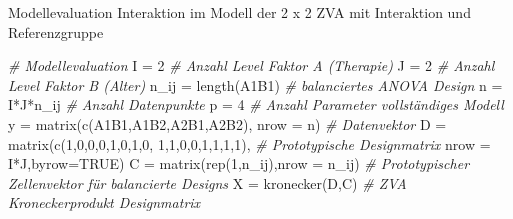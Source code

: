 \documentclass[
  8pt,
  ignorenonframetext,
]{beamer}
\newenvironment{Shaded}{\begin{snugshade}}{\end{snugshade}}
\newcommand{\AttributeTok}[1]{\textcolor[rgb]{0.77,0.63,0.00}{#1}}
\newcommand{\CommentTok}[1]{\textcolor[rgb]{0.56,0.35,0.01}{\textit{#1}}}
\newcommand{\ConstantTok}[1]{\textcolor[rgb]{0.00,0.00,0.00}{#1}}
\newcommand{\DecValTok}[1]{\textcolor[rgb]{0.00,0.00,0.81}{#1}}
\newcommand{\FunctionTok}[1]{\textcolor[rgb]{0.00,0.00,0.00}{#1}}
\newcommand{\NormalTok}[1]{#1}
\newcommand{\OtherTok}[1]{\textcolor[rgb]{0.56,0.35,0.01}{#1}}
\newcommand{\SpecialCharTok}[1]{\textcolor[rgb]{0.00,0.00,0.00}{#1}}
\begin{document}
\begin{frame}[fragile]{\small Modellevaluation \textbar{} Interaktion im
Modell der 2 x 2 ZVA mit Interaktion und Referenzgruppe}
\protect\hypertarget{modellevaluation-interaktion-im-modell-der-2-x-2-zva-mit-interaktion-und-referenzgruppe-1}{}
\vspace{3mm}
\tiny

\begin{Shaded}
\begin{Highlighting}[]
\CommentTok{\# Modellevaluation}
\NormalTok{I          }\OtherTok{=} \DecValTok{2}                                           \CommentTok{\# Anzahl Level Faktor A (Therapie)}
\NormalTok{J          }\OtherTok{=} \DecValTok{2}                                           \CommentTok{\# Anzahl Level Faktor B (Alter)}
\NormalTok{n\_ij       }\OtherTok{=} \FunctionTok{length}\NormalTok{(A1B1)                                }\CommentTok{\# balanciertes ANOVA Design}
\NormalTok{n          }\OtherTok{=}\NormalTok{ I}\SpecialCharTok{*}\NormalTok{J}\SpecialCharTok{*}\NormalTok{n\_ij                                    }\CommentTok{\# Anzahl Datenpunkte}
\NormalTok{p          }\OtherTok{=} \DecValTok{4}                                           \CommentTok{\# Anzahl Parameter vollständiges Modell}
\NormalTok{y          }\OtherTok{=} \FunctionTok{matrix}\NormalTok{(}\FunctionTok{c}\NormalTok{(A1B1,A1B2,A2B1,A2B2), }\AttributeTok{nrow =}\NormalTok{ n)    }\CommentTok{\# Datenvektor}
\NormalTok{D          }\OtherTok{=} \FunctionTok{matrix}\NormalTok{(}\FunctionTok{c}\NormalTok{(}\DecValTok{1}\NormalTok{,}\DecValTok{0}\NormalTok{,}\DecValTok{0}\NormalTok{,}\DecValTok{0}\NormalTok{,}\DecValTok{1}\NormalTok{,}\DecValTok{0}\NormalTok{,}\DecValTok{1}\NormalTok{,}\DecValTok{0}\NormalTok{, }\DecValTok{1}\NormalTok{,}\DecValTok{1}\NormalTok{,}\DecValTok{0}\NormalTok{,}\DecValTok{0}\NormalTok{,}\DecValTok{1}\NormalTok{,}\DecValTok{1}\NormalTok{,}\DecValTok{1}\NormalTok{,}\DecValTok{1}\NormalTok{), }\CommentTok{\# Prototypische Designmatrix}
                     \AttributeTok{nrow =}\NormalTok{ I}\SpecialCharTok{*}\NormalTok{J,}\AttributeTok{byrow=}\ConstantTok{TRUE}\NormalTok{)}
\NormalTok{C          }\OtherTok{=} \FunctionTok{matrix}\NormalTok{(}\FunctionTok{rep}\NormalTok{(}\DecValTok{1}\NormalTok{,n\_ij),}\AttributeTok{nrow =}\NormalTok{ n\_ij)             }\CommentTok{\# Prototypischer Zellenvektor für balancierte Designs}
\NormalTok{X          }\OtherTok{=} \FunctionTok{kronecker}\NormalTok{(D,C)                              }\CommentTok{\# ZVA Kroneckerprodukt Designmatrix}

\end{Highlighting}
\end{Shaded}
\end{frame}
\end{document}
